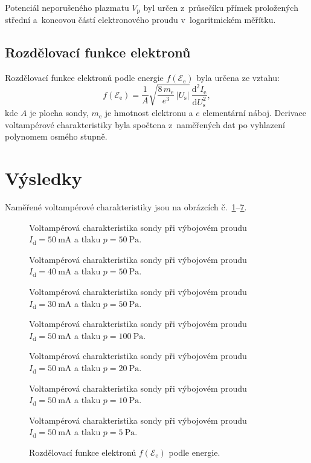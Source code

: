 \documentclass{protokol}
\newcommand\elemcharge{e}
\newcommand\masselec{m_\mathrm{e}}
\newcommand\pres{p}
\newcommand\idisch{I_\mathrm{d}}
\newcommand\ielec{I_\mathrm{e}}
\newcommand\plpot{V_\mathrm{p}}
\newcommand\uprobe{U_\mathrm{s}}
\newcommand\enelec{\mathcal E_\mathrm{e}}
\newcommand\eedf{f(\enelec)}
\begin{document}
Potenciál neporušeného plazmatu $\plpot$ byl určen z~průsečíku přímek
proložených střední a~koncovou částí elektronového proudu v~logaritmickém
měřítku.

\subsection{Rozdělovací funkce elektronů}
Rozdělovací funkce elektronů podle energie $\eedf$ byla určena ze vztahu:
\begin{equation}
	\label{eq:eedf}
	\eedf = \frac{1}{A} \sqrt{\frac{8\,\masselec}{\elemcharge^3}\,|\uprobe|}
		\,\frac{\mathrm d^2 \ielec}{\mathrm d\uprobe^2},
\end{equation}
kde $A$ je plocha sondy, $\masselec$ je hmotnost elektronu
a $\elemcharge$ elementární náboj.
Derivace voltampérové charakteristiky byla spočtena z~naměřených dat
po vyhlazení polynomem osmého stupně.

\section{Výsledky}
Naměřené voltampérové charakteristiky jsou na obrázcích
č.~\ref{fig:simple1-vac-1}--\ref{fig:simple1-vac-6}.

\newcommand\figvac[3]{
	\begin{figure}[htp]
		\centering
		
		
		\caption{Voltampérová charakteristika sondy
			při výbojovém proudu $\idisch = \SI{#2}{\milli\ampere}$
			a tlaku $\pres = \SI{#3}{\pascal}$.}
		\label{fig:simple1-vac-#1}
	\end{figure}
}

\figvac{1}{50}{50}
\figvac{2}{40}{50}
\figvac{3}{30}{50}

\figvac{7}{50}{100}
\figvac{4}{50}{20}
\figvac{5}{50}{10}
\figvac{6}{50}{5}

\newcommand\figeedf[3]{
	
}

\begin{figure}
	\centering
	
	
	
	\caption{Rozdělovací funkce elektronů $\eedf$ podle energie.}
	\label{fig:eedf}
\end{figure}

\printbibliography
\end{document}
